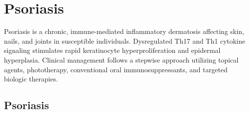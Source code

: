 \section{Psoriasis}








\label{sec:section:Psoriasis}
Psoriasis is a chronic, immune-mediated inflammatory dermatosis affecting skin, nails, and joints in susceptible individuals. Dysregulated Th17 and Th1 cytokine signaling stimulates rapid keratinocyte hyperproliferation and epidermal hyperplasia. Clinical management follows a stepwise approach utilizing topical agents, phototherapy, conventional oral immunosuppressants, and targeted biologic therapies.


\subsection{Psoriasis}
\label{sec:Psoriasis}

